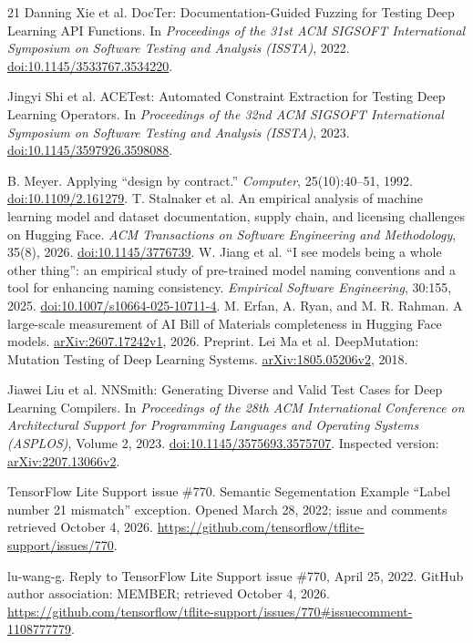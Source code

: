 \documentclass[10pt,twocolumn,letterpaper]{article}
\begin{document}
\begin{thebibliography}{21}
 Danning Xie et al. DocTer: Documentation-Guided Fuzzing for Testing Deep Learning API Functions. In \emph{Proceedings of the 31st ACM SIGSOFT International Symposium on Software Testing and Analysis (ISSTA)}, 2022. \href{https://doi.org/10.1145/3533767.3534220}{doi:10.1145/3533767.3534220}.

 Jingyi Shi et al. ACETest: Automated Constraint Extraction for Testing Deep Learning Operators. In \emph{Proceedings of the 32nd ACM SIGSOFT International Symposium on Software Testing and Analysis (ISSTA)}, 2023. \href{https://doi.org/10.1145/3597926.3598088}{doi:10.1145/3597926.3598088}.

 B. Meyer. Applying ``design by contract.'' \emph{Computer}, 25(10):40--51, 1992. \href{https://doi.org/10.1109/2.161279}{doi:10.1109/2.161279}.
 T. Stalnaker et al. An empirical analysis of machine learning model and dataset documentation, supply chain, and licensing challenges on Hugging Face. \emph{ACM Transactions on Software Engineering and Methodology}, 35(8), 2026. \href{https://doi.org/10.1145/3776739}{doi:10.1145/3776739}.
 W. Jiang et al. ``I see models being a whole other thing'': an empirical study of pre-trained model naming conventions and a tool for enhancing naming consistency. \emph{Empirical Software Engineering}, 30:155, 2025. \href{https://doi.org/10.1007/s10664-025-10711-4}{doi:10.1007/s10664-025-10711-4}.
 M. Erfan, A. Ryan, and M. R. Rahman. A large-scale measurement of AI Bill of Materials completeness in Hugging Face models. \href{https://arxiv.org/abs/2607.17242v1}{arXiv:2607.17242v1}, 2026. Preprint.
 Lei Ma et al.
DeepMutation: Mutation Testing of Deep Learning Systems.
\href{https://arxiv.org/abs/1805.05206v2}{arXiv:1805.05206v2}, 2018.

 Jiawei Liu et al.
NNSmith: Generating Diverse and Valid Test Cases for Deep Learning Compilers.
In \emph{Proceedings of the 28th ACM International Conference on Architectural
Support for Programming Languages and Operating Systems (ASPLOS)}, Volume 2,
2023.
\href{https://doi.org/10.1145/3575693.3575707}{doi:10.1145/3575693.3575707}.
Inspected version: \href{https://arxiv.org/abs/2207.13066v2}{arXiv:2207.13066v2}.

 TensorFlow Lite Support issue \#770.
Semantic Segementation Example ``Label number 21 mismatch'' exception.
Opened March 28, 2022; issue and comments retrieved October 4, 2026.
\url{https://github.com/tensorflow/tflite-support/issues/770}.

 lu-wang-g.
Reply to TensorFlow Lite Support issue \#770, April 25, 2022.
GitHub author association: MEMBER; retrieved October 4, 2026.
\url{https://github.com/tensorflow/tflite-support/issues/770#issuecomment-1108777779}.
\end{thebibliography}
\end{document}
